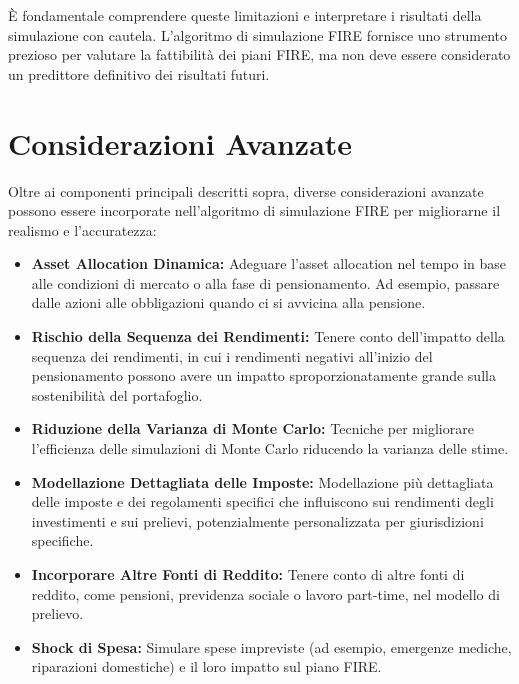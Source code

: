 \documentclass{article}
\begin{document}
    È fondamentale comprendere queste limitazioni e interpretare i risultati
    della simulazione con cautela.
    L'algoritmo di simulazione FIRE fornisce uno
    strumento prezioso per valutare la fattibilità dei piani FIRE, ma non deve
    essere considerato un predittore definitivo dei risultati futuri.

    \section{Considerazioni Avanzate}\label{sec:considerazioni-avanzate}

Oltre ai componenti principali descritti sopra, diverse considerazioni avanzate
possono essere incorporate nell'algoritmo di simulazione FIRE per migliorarne il
realismo e l'accuratezza:
    \begin{itemize}
        \item \textbf{Asset Allocation Dinamica:} Adeguare l'asset allocation
        nel tempo in base alle condizioni di mercato o alla fase di
        pensionamento.
        Ad esempio, passare dalle azioni alle obbligazioni quando
        ci si avvicina alla pensione.
        \item \textbf{Rischio della Sequenza dei Rendimenti:} Tenere conto
        dell'impatto della sequenza dei rendimenti, in cui i rendimenti negativi
        all'inizio del pensionamento possono avere un impatto
        sproporzionatamente grande sulla sostenibilità del portafoglio.
        \item \textbf{Riduzione della Varianza di Monte Carlo:} Tecniche per
        migliorare l'efficienza delle simulazioni di Monte Carlo riducendo la
        varianza delle stime.
        \item \textbf{Modellazione Dettagliata delle Imposte:} Modellazione più
        dettagliata delle imposte e dei regolamenti specifici che influiscono
        sui rendimenti degli investimenti e sui prelievi, potenzialmente
        personalizzata per giurisdizioni specifiche.
        \item \textbf{Incorporare Altre Fonti di Reddito:} Tenere conto di altre
        fonti di reddito, come pensioni, previdenza sociale o lavoro part-time,
        nel modello di prelievo.
        \item \textbf{Shock di Spesa:} Simulare spese impreviste (ad esempio,
        emergenze mediche, riparazioni domestiche) e il loro impatto sul piano
        FIRE\@.
    \end{itemize}
\end{document}
